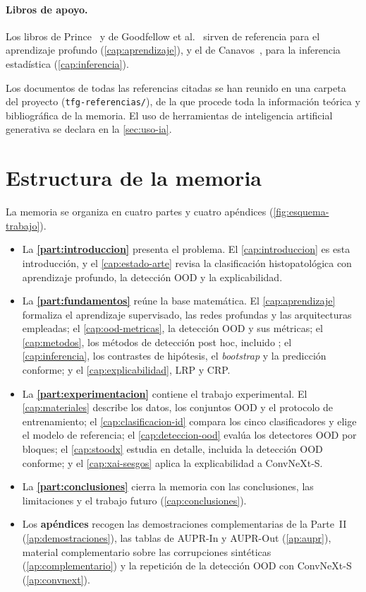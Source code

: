 \paragraph{Libros de apoyo.} Los libros de Prince~\cite{prince2023understanding} y de Goodfellow et al.~\cite{goodfellow2016deep} sirven de referencia para el aprendizaje profundo (\cref{cap:aprendizaje}), y el de Canavos~\cite{canavos2003}, para la inferencia estadística (\cref{cap:inferencia}).

Los documentos de todas las referencias citadas se han reunido en una carpeta del proyecto (\texttt{tfg-referencias/}), de la que procede toda la información teórica y bibliográfica de la memoria. El uso de herramientas de inteligencia artificial generativa se declara en la \cref{sec:uso-ia}.

\section{Estructura de la memoria}\label{sec:estructura}

La memoria se organiza en cuatro partes y cuatro apéndices (\cref{fig:esquema-trabajo}).

\begin{itemize}
  \item La \textbf{\cref{part:introduccion}} presenta el problema. El \cref{cap:introduccion} es esta introducción, y el \cref{cap:estado-arte} revisa la clasificación histopatológica con aprendizaje profundo, la detección OOD y la explicabilidad.
  \item La \textbf{\cref{part:fundamentos}} reúne la base matemática. El \cref{cap:aprendizaje} formaliza el aprendizaje supervisado, las redes profundas y las arquitecturas empleadas; el \cref{cap:ood-metricas}, la detección OOD y sus métricas; el \cref{cap:metodos}, los métodos de detección post hoc, incluido \stoodx; el \cref{cap:inferencia}, los contrastes de hipótesis, el \emph{bootstrap} y la predicción conforme; y el \cref{cap:explicabilidad}, LRP y CRP.
  \item La \textbf{\cref{part:experimentacion}} contiene el trabajo experimental. El \cref{cap:materiales} describe los datos, los conjuntos OOD y el protocolo de entrenamiento; el \cref{cap:clasificacion-id} compara los cinco clasificadores y elige el modelo de referencia; el \cref{cap:deteccion-ood} evalúa los detectores OOD por bloques; el \cref{cap:stoodx} estudia \stoodx en detalle, incluida la detección OOD conforme; y el \cref{cap:xai-sesgos} aplica la explicabilidad a ConvNeXt-S.
  \item La \textbf{\cref{part:conclusiones}} cierra la memoria con las conclusiones, las limitaciones y el trabajo futuro (\cref{cap:conclusiones}).
  \item Los \textbf{apéndices} recogen las demostraciones complementarias de la Parte~II (\cref{ap:demostraciones}), las tablas de AUPR-In y AUPR-Out (\cref{ap:aupr}), material complementario sobre las corrupciones sintéticas (\cref{ap:complementario}) y la repetición de la detección OOD con ConvNeXt-S (\cref{ap:convnext}).
\end{itemize}

